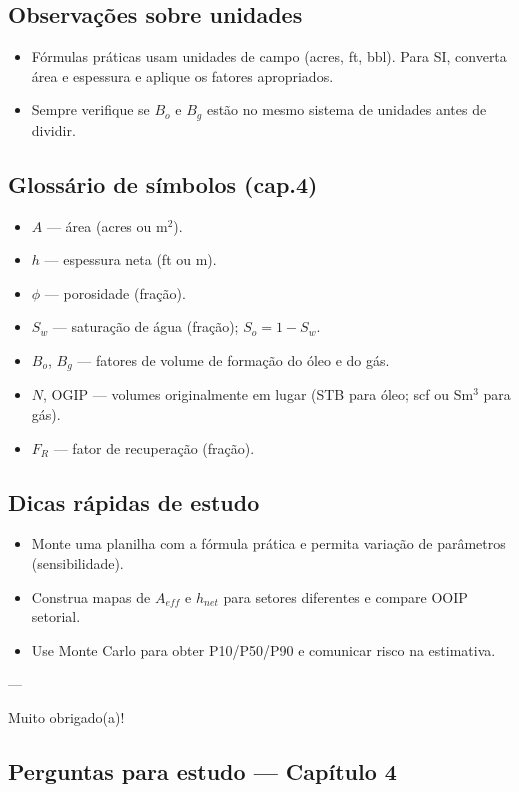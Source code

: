 \documentclass[11pt,a4paper]{article}
\begin{document}
\subsection{Observações sobre unidades}
\begin{itemize}
\item Fórmulas práticas usam unidades de campo (acres, ft, bbl). Para SI, converta área e espessura e aplique os fatores apropriados.
\item Sempre verifique se $B_o$ e $B_g$ estão no mesmo sistema de unidades antes de dividir.
\end{itemize}

\subsection{Glossário de símbolos (cap.4)}
\begin{itemize}
\item $A$ — área (acres ou m$^2$).
\item $h$ — espessura neta (ft ou m).
\item $\phi$ — porosidade (fração).
\item $S_w$ — saturação de água (fração); $S_o = 1-S_w$.
\item $B_o$, $B_g$ — fatores de volume de formação do óleo e do gás.
\item $N$, OGIP — volumes originalmente em lugar (STB para óleo; scf ou Sm$^3$ para gás).
\item $F_R$ — fator de recuperação (fração).
\end{itemize}

\subsection{Dicas rápidas de estudo}
\begin{itemize}
\item Monte uma planilha com a fórmula prática e permita variação de parâmetros (sensibilidade).
\item Construa mapas de $A_{eff}$ e $h_{net}$ para setores diferentes e compare OOIP setorial.
\item Use Monte Carlo para obter P10/P50/P90 e comunicar risco na estimativa.
\end{itemize}

---

Muito obrigado(a)!

\subsection*{Perguntas para estudo --- Capítulo 4}
\end{document}
